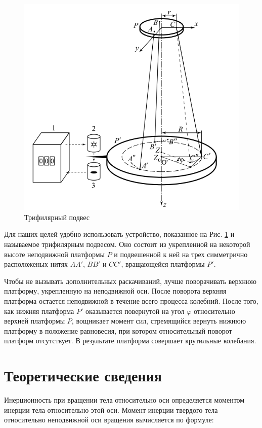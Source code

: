 \documentclass[a4paper,14pt]{extarticle}
\begin{document}
	\begin{figure}
		\includegraphics[width=0.95\linewidth]{ustan.png}
		\caption{Трифилярный подвес}
		\label{ust}
	\end{figure}
	
	Для наших целей удобно использовать устройство, показанное на Рис. \ref{ust} и называемое трифилярным подвесом. Оно состоит из укрепленной на некоторой высоте неподвижной платформы $P$ и подвешенной к ней на трех симметрично расположеных нитях $AA'$, $BB'$ и $CC'$, вращающейся платформы $P'$. 
	
	Чтобы не вызывать дополнительных раскачиваний, лучше поворачивать верхнюю платформу, укрепленную на неподвижной оси. После поворота верхняя платформа остается неподвижной в течение всего процесса колебний. После того, как нижняя платформа $P'$ оказывается повернутой на угол $\varphi$ относительно верхней платформы $P$, вощникает момент сил, стремящийся вернуть нижнюю платформу в положение равновесия, при котором относительный поворот платформ отсутствует. В результате платформа совершает крутильные колебания.
	
	\section{Теоретические сведения}
	
	\par Инерционность при вращении тела относительно оси определяется моментом инерции тела относительно этой оси. Момент инерции твердого тела относительно неподвижной оси вращения вычисляется по формуле:
	
\end{document}
